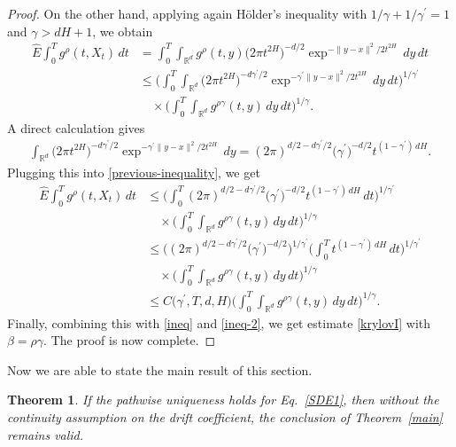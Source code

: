 \documentclass[numbers,compress,v1.0.1]{vmsta}
\def\R{{ \mathbb{R}}}
\newtheorem{theorem}{Theorem}[section]
\theoremstyle{definition}
\begin{document}
\begin{proof}
On the other hand, applying again H\"{o}lder's inequality with $1/\gamma
+1/\gamma^{\prime}=1$
and $\gamma>dH+1$, we obtain
%
\begin{align}
\label{previous-inequality}
\widehat{E}\int_{0}^{T}g^{\rho}(t,X_{t})\,dt&=\int_{0}^{T} \int_{\R^d}g^{\rho}(t,y)\bigl(2\pi t^{2H}\bigr)^{-d/2}\exp^{-\|y-x\|^{2}/2t^{2H}}\,dy\,dt\nonumber\\[-3pt]
&\leq \Biggl(\int_{0}^{T}\int_{\R^d} \bigl(2\pi t^{2H}\bigr)^{-d\gamma^{\prime}/2}\exp^{-\gamma^{\prime}\|y-x\|^{2}/2 t^{2H}}\,dy\,dt \Biggr)^{1/\gamma^{\prime}}\nonumber\\[-3pt]
&\quad \times \Biggl(\int_{0}^{T}\int_{\R^d} g^{\rho\gamma}(t,y)\,dy\,dt \Biggr)^{1/\gamma}.
\end{align}
%
A direct calculation gives
%
\begin{eqnarray*}
\int_{\R^d}\bigl(2\pi t^{2H}\bigr)^{-d\gamma^{\prime} /2}
\exp^{-\gamma^{\prime}\|
y-x\|^{2}/2t^{2H}}\,dy =(2\pi)^{d/2-d\gamma^{\prime} /2} \bigl(\gamma^{\prime}
\bigr)^{-d/2}t^{(1-\gamma^{\prime})\,dH}.
\end{eqnarray*}
%
Plugging this into \eqref{previous-inequality}, we get
%
\begin{align*}
\widehat{E}\int_{0}^{T}g^{\rho}(t,X_{t})\,dt&\leq \Biggl(\int_{0}^{T}(2\pi)^{d/2-d\gamma^{\prime} /2}\bigl(\gamma ^{\prime} \bigr)^{-d/2}t^{(1-\gamma^{\prime})\,dH}\,dt\Biggr)^{1/\gamma^{\prime}}\\[-3pt]
&\quad \times \Biggl(\int_{0}^{T}\int_{\R^d} g^{\rho\gamma}(t,y)\,dy\,dt \Biggr)^{1/\gamma}\\[-3pt]
&\leq \bigl((2\pi)^{d/2-d\gamma^{\prime} /2} \bigl(\gamma^{\prime}\bigr)^{-d/2} \bigr)^{1/\gamma^{\prime}} \Biggl(\int_{0}^{T}t^{(1-\gamma^{\prime})\,dH}\,dt\Biggr)^{1/\gamma^{\prime}}\\
&\quad \times \Biggl(\int_{0}^{T}\int_{\R^d} g^{\rho\gamma}(t,y)\,dy\,dt \Biggr)^{1/\gamma}\\
&\leq C\bigl(\gamma^{\prime},T,d,H\bigr) \Biggl(\int_{0}^{T}\int_{\R^d} g^{\rho\gamma}(t,y)\,dy\,dt \Biggr)^{1/\gamma}.
\end{align*}
%
Finally, combining this with \eqref{ineq} and \eqref{ineq-2}, we get
estimate \eqref{krylovI} with $\beta=\rho\gamma$. The proof is now complete.
\end{proof}
%
Now we are able to state the main result of this section.
%
\begin{theorem}
If the pathwise uniqueness holds for Eq.~\eqref{SDE1}, then without the
continuity assumption on the drift coefficient, the conclusion of
Theorem~\ref{main} remains valid.
\end{theorem}
\end{document}

